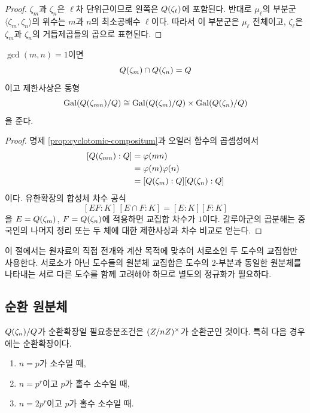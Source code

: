 \begin{proof}
$\zeta_m$과 $\zeta_n$은 $\ell$차 단위근이므로 왼쪽은 $Q(\zeta_\ell)$에 포함된다. 반대로 $\mu_\ell$의 부분군 $\langle\zeta_m,\zeta_n\rangle$의 위수는 $m$과 $n$의 최소공배수 $\ell$이다. 따라서 이 부분군은 $\mu_\ell$ 전체이고, $\zeta_\ell$은 $\zeta_m$과 $\zeta_n$의 거듭제곱들의 곱으로 표현된다.
\end{proof}

\begin{theorem}
\label{thm:coprime-cyclotomic-intersection}
$\gcd(m,n)=1$이면
\[
  Q(\zeta_m)\cap Q(\zeta_n)=Q
\]
이고 제한사상은 동형
\[
  \operatorname{Gal}(Q(\zeta_{mn})/Q)
  \cong
  \operatorname{Gal}(Q(\zeta_m)/Q)
  \times
  \operatorname{Gal}(Q(\zeta_n)/Q)
\]
을 준다.
\end{theorem}

\begin{proof}
명제 \ref{prop:cyclotomic-compositum}과 오일러 함수의 곱셈성에서
\[
\begin{aligned}
  [\Q(\zeta_{mn}):\Q]
  &=\varphi(mn)\\
  &=\varphi(m)\varphi(n)\\
  &=[\Q(\zeta_m):\Q]
    [\Q(\zeta_n):\Q]
\end{aligned}
\]
이다. 유한확장의 합성체 차수 공식
\[
  [EF:K]\,[E\cap F:K]=[E:K][F:K]
\]
을 $E=Q(\zeta_m)$, $F=Q(\zeta_n)$에 적용하면 교집합 차수가 $1$이다. 갈루아군의 곱분해는 중국인의 나머지 정리 또는 두 체에 대한 제한사상과 차수 비교로 얻는다.
\end{proof}

\begin{remark}
이 절에서는 원자료의 직접 전개와 계산 목적에 맞추어 서로소인 두 도수의 교집합만 사용한다. 서로소가 아닌 도수들의 원분체 교집합은 도수의 $2$-부분과 동일한 원분체를 나타내는 서로 다른 도수를 함께 고려해야 하므로 별도의 정규화가 필요하다.
\end{remark}

\subsection{순환 원분체}

\begin{corollary}
$Q(\zeta_n)/Q$가 순환확장일 필요충분조건은 $(Z/nZ)^\times$가 순환군인 것이다. 특히 다음 경우에는 순환확장이다.
\begin{enumerate}[label=(\roman*)]
  \item $n=p$가 소수일 때,
  \item $n=p^r$이고 $p$가 홀수 소수일 때,
  \item $n=2p^r$이고 $p$가 홀수 소수일 때.
\end{enumerate}
\end{corollary}

